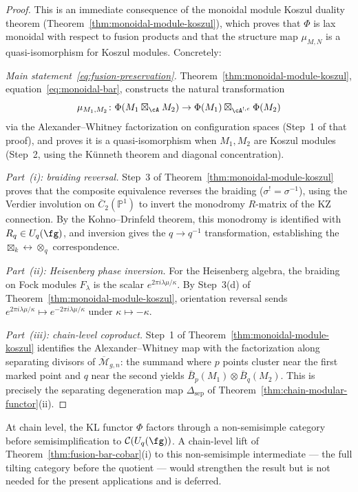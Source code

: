 \begin{proof}
This is an immediate consequence of the monoidal module
Koszul duality theorem
(Theorem~\ref{thm:monoidal-module-koszul}), which proves that
$\Phi$ is lax monoidal with respect to fusion products and that the
structure map $\mu_{M,N}$ is a quasi-isomorphism for Koszul modules.
Concretely:

\emph{Main statement~\eqref{eq:fusion-preservation}.}\quad
Theorem~\ref{thm:monoidal-module-koszul},
equation~\eqref{eq:monoidal-bar}, constructs the natural transformation
\[
\mu_{M_1, M_2}\colon \Phi(M_1 \boxtimes_\cA M_2) \to
\Phi(M_1) \boxtimes_{\cA^{!,c}} \Phi(M_2)
\]
via the Alexander--Whitney factorization on configuration spaces
(Step~1 of that proof), and proves it is a quasi-isomorphism when
$M_1, M_2$ are Koszul modules (Step~2, using the K\"unneth theorem
and diagonal concentration).

\emph{Part~(i): braiding reversal.}\quad
Step~3 of Theorem~\ref{thm:monoidal-module-koszul} proves that the
composite equivalence reverses the braiding ($\sigma^! = \sigma^{-1}$),
using the Verdier involution on $\overline{C}_2(\mathbb{P}^1)$ to
invert the monodromy $R$-matrix of the KZ connection.  By the
Kohno--Drinfeld theorem, this monodromy is identified with
$R_q \in U_q(\fg)$, and inversion gives the $q \to q^{-1}$
transformation, establishing the $\boxtimes_k \leftrightarrow \otimes_q$
correspondence.

\emph{Part~(ii): Heisenberg phase inversion.}\quad
For the Heisenberg algebra, the braiding on Fock modules $F_\lambda$ is
the scalar $e^{2\pi i\lambda\mu/\kappa}$.  By Step~3(d) of
Theorem~\ref{thm:monoidal-module-koszul}, orientation reversal sends
$e^{2\pi i\lambda\mu/\kappa} \mapsto e^{-2\pi i\lambda\mu/\kappa}$
under $\kappa \mapsto -\kappa$.

\emph{Part~(iii): chain-level coproduct.}\quad
Step~1 of Theorem~\ref{thm:monoidal-module-koszul} identifies the
Alexander--Whitney map with the factorization along separating
divisors of $\overline{\mathcal{M}}_{g,n}$: the summand where $p$
points cluster near the first marked point and $q$ near the second
yields $\bar{B}_p(M_1) \otimes \bar{B}_q(M_2)$.  This is
precisely the separating degeneration map $\Delta_{\mathrm{sep}}$ of
Theorem~\ref{thm:chain-modular-functor}(ii).
\end{proof}

\begin{remark}\label{rem:fusion-nonsemisimple}
At chain level, the KL functor $\Phi$ factors through
a non-semisimple category before semisimplification to
$\mathcal{C}(U_q(\fg))$.  A chain-level lift of
Theorem~\ref{thm:fusion-bar-cobar}(i) to this non-semisimple
intermediate --- the full tilting category before the quotient ---
would strengthen the result but is not needed for the present
applications and is deferred.
\end{remark}

